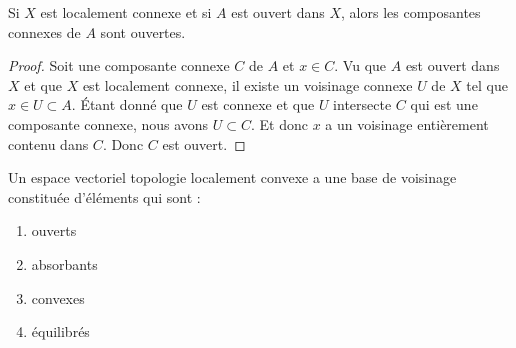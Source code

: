 \begin{proposition}	\label{PROPooJSPTooOevbKE}
	Si \( X\) est localement connexe et si \( A\) est ouvert dans \( X\), alors les composantes connexes de \( A\) sont ouvertes.
\end{proposition}

\begin{proof}
	Soit une composante connexe \( C\) de \( A\) et \( x\in C\). Vu que \( A\) est ouvert dans \( X\) et que \( X\) est localement connexe, il existe un voisinage connexe \(U \) de \( X\) tel que \( x\in U\subset A\). Étant donné que \( U\) est connexe et que \( U\) intersecte \( C\) qui est une composante connexe, nous avons \( U\subset C\). Et donc \( x\) a un voisinage entièrement contenu dans \( C\). Donc \( C\) est ouvert.
\end{proof}

\begin{proposition}		\label{PROPooOAXHooOGhRbu}
	Un espace vectoriel topologie localement convexe a une base de voisinage constituée d'éléments qui sont :
	\begin{enumerate}
		\item
		      ouverts
		\item
		      absorbants
		\item
		      convexes
		\item
		      équilibrés
	\end{enumerate}
\end{proposition}

